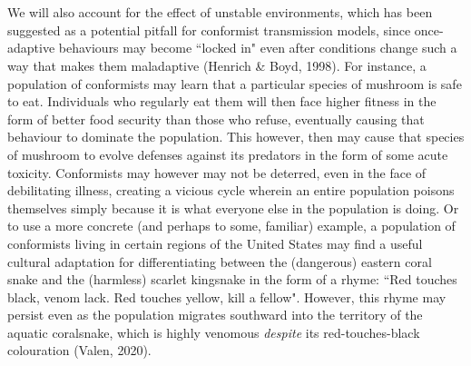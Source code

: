 \documentclass[a4paper,8pt]{extarticle}
\begin{document}
\\\\
We will also account for the effect of unstable environments, which has been suggested as a potential pitfall for conformist transmission models, since once-adaptive behaviours may become ``locked in" even after conditions change such a way that makes them maladaptive (Henrich \& Boyd, 1998). For instance, a population of conformists may learn that a particular species of mushroom is safe to eat. Individuals who regularly eat them will then face higher fitness in the form of better food security than those who refuse, eventually causing that behaviour to dominate the population. This however, then may cause that species of mushroom to evolve defenses against its predators in the form of some acute toxicity. Conformists may however may not be deterred, even in the face of debilitating illness, creating a vicious cycle wherein an entire population poisons themselves simply because it is what everyone else in the population is doing. Or to use a more concrete (and perhaps to some, familiar) example, a population of conformists living in certain regions of the United States may find a useful cultural adaptation for differentiating between the (dangerous) eastern coral snake and the (harmless) scarlet kingsnake in the form of a rhyme: ``Red touches black, venom lack. Red touches yellow, kill a fellow". However, this rhyme may persist even as the population migrates southward into the territory of the aquatic coralsnake, which is highly venomous \emph{despite} its red-touches-black colouration (Valen, 2020). 
\end{document}
